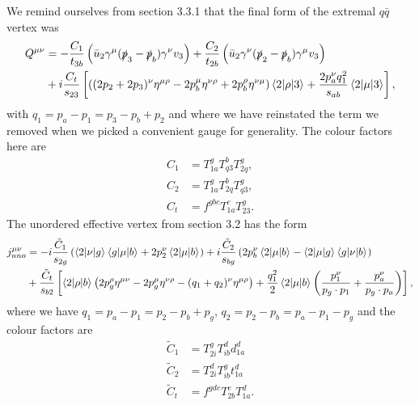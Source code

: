 We remind ourselves from section 3.3.1 that the final form of the extremal $q\bar{q}$ vertex was
\begin{equation}
\begin{split}
Q^{\mu \nu} &= -\frac{C_1}{t_{3b}} \left(\bar{u}_2 \gamma^\mu (\slashed{p}_3-\slashed{p}_b)\gamma^\nu v_3 \right) + \frac{C_2}{t_{2b}} \left( \bar{u}_2 \gamma^\nu (\slashed{p}_2-\slashed{p}_b) \gamma^\mu v_3 \right)  \\
&+ i  \frac{C_t}{s_{23}} \left[\left((2p_2+2p_3)^\nu \eta^{\mu \rho} - 2p_b^\mu \eta^{\nu \rho} + 2p_b^\rho \eta^{\nu \mu} \right) \mathinner{\langle2\vert\rho\vert3\rangle}_{} + \frac{2 p_a^\nu q_1^2}{s_{ab}} \mathinner{\langle2\vert\mu\vert3\rangle}_{} \right],
\end{split}
\end{equation}
with $q_1 = p_a - p_1 = p_3 - p_b + p_2$ and where we have reinstated the term we removed when we picked a convenient gauge for generality. The colour factors here are
\begin{equation}
\begin{split}
C_1 &= T^g_{1a} T^b_{q3}T^g_{2q}, \\
C_2 &= T^g_{1a} T^b_{2q}T^g_{q3}, \\
C_t &= f^{gbc}T^c_{1a}T^g_{23}.
\end{split}
\end{equation}
The unordered effective vertex from section 3.2 has the form
\begin{equation}
\begin{split}
j_{uno}^{\mu \nu} &= -i \frac{\tilde{C}_1}{s_{2g}} \left(\mathinner{\langle2\vert\nu\vert g\rangle}_{}\mathinner{\langle g\vert\mu\vert b\rangle}_{} + 2p_2^\nu \mathinner{\langle2\vert\mu\vert b\rangle}_{} \right) + i \frac{\tilde{C}_2}{s_{bg}} \left(2p_b^\nu \mathinner{\langle2\vert\mu\vert b\rangle}_{} - \mathinner{\langle2\vert\mu\vert g\rangle}_{} \mathinner{\langle g\vert\nu\vert b\rangle}_{} \right) \\
&+ \frac{\tilde{C}_t}{s_{b2}} \left[\mathinner{\langle2\vert\rho\vert b\rangle}_{} \left(2p_g^\rho \eta^{\mu \nu} - 2 p_g^\mu \eta^{\nu \rho} - (q_1 + q_2)^\nu \eta^{\mu \rho} \right) + \frac{q_1^2}{2} \mathinner{\langle2\vert\mu\vert b\rangle}_{} \left(\frac{p_1^\nu}{p_g \cdot p_1} + \frac{p_a^\nu}{p_g \cdot p_a} \right) \right],
\end{split}
\end{equation}
where we have $q_1 = p_a - p_1 = p_2 - p_b + p_g$, $q_2 = p_2 - p_b = p_a - p_1 - p_g$ and the colour factors are
\begin{equation}
\begin{split}
\tilde{C}_1 &= T_{2i}^g T_{ib}^d d^d_{1a} \\
\tilde{C}_2 &= T^d_{2i} T_{ib}^g t_{1a}^d \\
\tilde{C}_t &= f^{gde}T^e_{2b}T^d_{1a}.
\end{split}
\end{equation}
